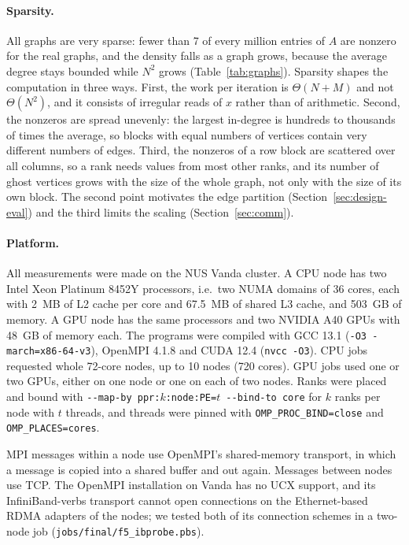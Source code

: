 \documentclass[11pt,a4paper]{article}
\newcommand{\code}[1]{\texttt{#1}}
\begin{document}
\paragraph{Sparsity.} All graphs are very sparse: fewer than 7 of every million entries of $A$ are nonzero for the
real graphs, and the density falls as a graph grows, because the average degree stays bounded while $N^2$ grows
(Table~\ref{tab:graphs}). Sparsity shapes the computation in three ways. First, the work per iteration is
$\Theta(N+M)$ and not $\Theta(N^2)$, and it consists of irregular reads of $x$ rather than of arithmetic. Second,
the nonzeros are spread unevenly: the largest in-degree is hundreds to thousands of times the average, so blocks
with equal numbers of vertices contain very different numbers of edges. Third, the nonzeros of a row block are
scattered over all columns, so a rank needs values from most other ranks, and its number of ghost vertices grows
with the size of the whole graph, not only with the size of its own block. The second point motivates the edge
partition (Section~\ref{sec:design-eval}) and the third limits the scaling (Section~\ref{sec:comm}).

\paragraph{Platform.} All measurements were made on the NUS Vanda cluster. A CPU node has two Intel Xeon Platinum
8452Y processors, i.e.\ two NUMA domains of 36 cores, each with 2~MB of L2 cache per core and 67.5~MB of shared L3
cache, and 503~GB of memory. A GPU node has the same processors and two NVIDIA A40 GPUs with 48~GB of memory each.
The programs were compiled with GCC 13.1 (\code{-O3 -march=x86-64-v3}), OpenMPI 4.1.8 and CUDA 12.4 (\code{nvcc
-O3}). CPU jobs requested whole 72-core nodes, up to 10 nodes (720 cores). GPU jobs used one or two GPUs, either on
one node or one on each of two nodes. Ranks were placed and bound with \code{-{}-map-by ppr:$k$:node:PE=$t$ -{}-bind-to
core} for $k$ ranks per node with $t$ threads, and threads were pinned with \code{OMP\_PROC\_BIND=close} and
\code{OMP\_PLACES=cores}.

MPI messages within a node use OpenMPI's shared-memory transport, in which a message is copied into a shared buffer
and out again. Messages between nodes use TCP. The OpenMPI installation on Vanda has no UCX support, and its
InfiniBand-verbs transport cannot open connections on the Ethernet-based RDMA adapters of the nodes; we tested both
of its connection schemes in a two-node job (\code{jobs/final/f5\_ibprobe.pbs}).
\end{document}
